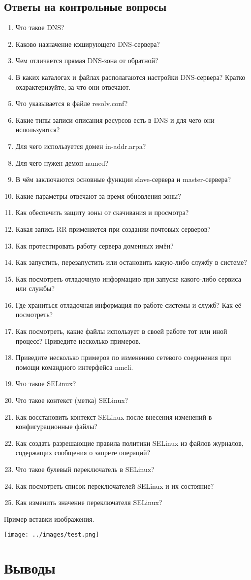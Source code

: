 \subsection{Ответы на контрольные вопросы}
\begin{enumerate}
    \item Что такое DNS?
    \item Каково назначение кэширующего DNS-сервера?
    \item Чем отличается прямая DNS-зона от обратной?
    \item В каких каталогах и файлах располагаются настройки DNS-сервера? Кратко охарактеризуйте, за что они отвечают.
    \item Что указывается в файле resolv.conf?
    \item Какие типы записи описания ресурсов есть в DNS и для чего они используются?
    \item Для чего используется домен in-addr.arpa?
    \item Для чего нужен демон named?
    \item В чём заключаются основные функции slave-сервера и master-сервера?
    \item Какие параметры отвечают за время обновления зоны?
    \item Как обеспечить защиту зоны от скачивания и просмотра?
    \item Какая запись RR применяется при создании почтовых серверов?
    \item Как протестировать работу сервера доменных имён?
    \item Как запустить, перезапустить или остановить какую-либо службу в системе?
    \item Как посмотреть отладочную информацию при запуске какого-либо сервиса или службы?
    \item Где храниться отладочная информация по работе системы и служб? Как её посмотреть?
    \item Как посмотреть, какие файлы использует в своей работе тот или иной процесс? Приведите несколько примеров.
    \item Приведите несколько примеров по изменению сетевого соединения при помощи командного интерфейса nmcli.
    \item Что такое SELinux?
    \item Что такое контекст (метка) SELinux?
    \item Как восстановить контекст SELinux после внесения изменений в конфигурационные файлы?
    \item Как создать разрешающие правила политики SELinux из файлов журналов, содержащих сообщения о запрете операций?
    \item Что такое булевый переключатель в SELinux?
    \item Как посмотреть список переключателей SELinux и их состояние?
    \item Как изменить значение переключателя SELinux?
\end{enumerate}

Пример вставки изображения.
\begin{center}
    \centering
    \texttt{[image: ../images/test.png]}
    \label{img:test}
\end{center}


\section{Выводы}



